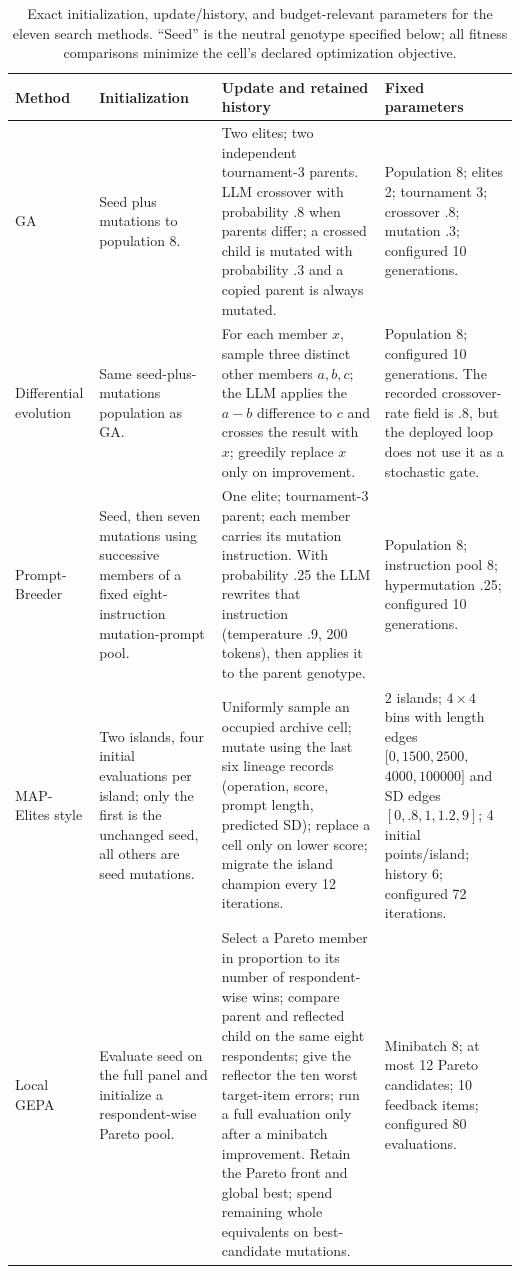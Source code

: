 \begin{table}[H]
\caption{Exact initialization, update/history, and budget-relevant parameters
for the eleven search methods.  ``Seed'' is the neutral genotype specified
below; all fitness comparisons minimize the cell's declared optimization
objective.}
\label{tab:repro-search}
\centering
\small
\setlength{\tabcolsep}{3pt}
\begin{tabular}{p{}p{}p{}p{}}
\toprule
Method & Initialization & Update and retained history & Fixed parameters \\
\midrule
GA & Seed plus mutations to population 8. & Two elites; two independent
tournament-$3$ parents.  LLM crossover with probability .8 when parents differ;
a crossed child is mutated with probability .3 and a copied parent is always
mutated. & Population 8; elites 2; tournament 3; crossover .8; mutation .3;
configured 10 generations. \\

Differential evolution & Same seed-plus-mutations population as GA. & For each
member $x$, sample three distinct other members $a,b,c$; the LLM applies the
$a-b$ difference to $c$ and crosses the result with $x$; greedily replace $x$
only on improvement. & Population 8; configured 10 generations.  The recorded
crossover-rate field is .8, but the deployed loop does not use it as a
stochastic gate. \\

Prompt-\allowbreak Breeder & Seed, then seven mutations using successive members of a fixed
eight-instruction mutation-prompt pool. & One elite; tournament-$3$ parent;
each member carries its mutation instruction.  With probability .25 the LLM
rewrites that instruction (temperature .9, 200 tokens), then applies it to the
parent genotype. & Population 8; instruction pool 8; hypermutation .25;
configured 10 generations. \\

MAP-Elites style & Two islands, four initial evaluations per island; only the
first is the unchanged seed, all others are seed mutations. & Uniformly sample
an occupied archive cell; mutate using the last six lineage records
(operation, score, prompt length, predicted SD); replace a cell only on lower
score; migrate the island champion every 12 iterations. & $2$ islands;
$4\times4$ bins with length edges $[0,1500,2500,$ $4000,100000]$ and SD edges
$[0,.8,1,1.2,9]$; 4 initial points/island; history 6; configured 72 iterations. \\

Local GEPA & Evaluate seed on the full panel and initialize a respondent-wise
Pareto pool. & Select a Pareto member in proportion to its number of
respondent-wise wins; compare parent and reflected child on the same eight
respondents; give the reflector the ten worst target-item errors; run a full
evaluation only after a minibatch improvement.  Retain the Pareto front and
global best; spend remaining whole equivalents on best-candidate mutations. &
Minibatch 8; at most 12 Pareto candidates; 10 feedback items; configured 80
evaluations. \\

\bottomrule
\end{tabular}
\end{table}
